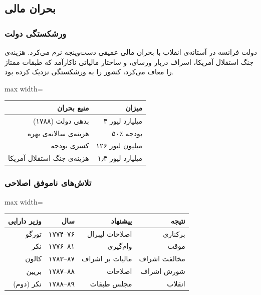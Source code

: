 %
\subsection{بحران مالی}
\label{sec:financial}

\subsubsection{ورشکستگی دولت}

دولت فرانسه در آستانه‌ی انقلاب با بحران مالی عمیقی دست‌وپنجه نرم می‌کرد.
هزینه‌ی جنگ استقلال آمریکا، اسراف دربار ورسای، و ساختار مالیاتی ناکارآمد
که طبقات ممتاز را معاف می‌کرد، کشور را به ورشکستگی نزدیک کرده بود.

\begin{center}
\begin{adjustbox}{max width=\linewidth}%
\begin{tabular}{rr}
\toprule
\rowcolor{PrimaryDeep}
\color{white}\bfseries منبع بحران & \color{white}\bfseries میزان \\
\midrule
\rowcolor{BgWarm} بدهی دولت (۱۷۸۸) & ۴ میلیارد لیور \\
\rowcolor{BgCool} هزینه‌ی سالانه‌ی بهره & ۵۰٪ بودجه \\
\rowcolor{BgWarm} کسری بودجه & ۱۲۶ میلیون لیور \\
\rowcolor{BgCool} هزینه‌ی جنگ استقلال آمریکا & ۱٫۳ میلیارد لیور \\
\bottomrule
\end{tabular}
\end{adjustbox}
\end{center}

\subsubsection{تلاش‌های ناموفق اصلاحی}

\begin{center}
\begin{adjustbox}{max width=\linewidth}%
\begin{tabular}{rrrr}
\toprule
\rowcolor{PrimaryDeep}
\color{white}\bfseries وزیر دارایی & \color{white}\bfseries سال
  & \color{white}\bfseries پیشنهاد & \color{white}\bfseries نتیجه \\
\midrule
\rowcolor{BgWarm} تورگو & ۱۷۷۴–۷۶ & اصلاحات لیبرال & برکناری \\
\rowcolor{BgCool} نکر & ۱۷۷۶–۸۱ & وام‌گیری & موقت \\
\rowcolor{BgWarm} کالون & ۱۷۸۳–۸۷ & مالیات بر اشراف & مخالفت اشراف \\
\rowcolor{BgCool} بریین & ۱۷۸۷–۸۸ & اصلاحات & شورش اشراف \\
\rowcolor{BgWarm} نکر (دوم) & ۱۷۸۸–۸۹ & مجلس طبقات & انقلاب \\
\bottomrule
\end{tabular}
\end{adjustbox}
\end{center}

